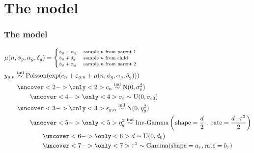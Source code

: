 \documentclass[handout]{beamer}
\providecommand{\e}{\varepsilon}
\numberwithin{equation}{section}
\begin{document}
\section{The model}
\setcounter{subsection}{1}

\begin{frame}
\frametitle{The model}

\begin{align*}
& \scriptsize \mu(n, \phi_g, \alpha_g, \delta_g) = \begin{cases}
\phi_g - \alpha_g & \text{ sample $n$ from parent 1} \\
\phi_g + \delta_g & \text{ sample $n$ from child} \\
\phi_g + \alpha_g & \text{ sample $n$ from parent 2} \\
\end{cases} \\ 
&y_{g,n} \stackrel{\text{ind}}{\sim} \text{Poisson}(\exp(c_n + \e_{g, n} + \mu(n, \phi_g, \alpha_g, \delta_g))) \\
&\qquad \uncover<2->{\only<2>{\color{blue}}c_n \stackrel{\text{ind}}{\sim} \text{N}(0, \sigma_c^2)} \\
& \qquad \qquad \uncover<4->{\only<4>{\color{blue}}\sigma_c \stackrel{\text{}}{\sim} \text{U}(0, \sigma_{c0})} \\
& \qquad \uncover<3->{\only<3>{\color{blue}}\e_{g, n} \stackrel{\text{ind}}{\sim} \text{N}(0, \eta_g^2)} \\
& \qquad \qquad \uncover<5->{\only<5>{\color{blue}}\eta_g^2 \stackrel{\text{ind}}{\sim} \text{Inv-Gamma}\left (\left . \text{shape} = \frac{d}{2} \right ., \ \text{rate} =  \frac{d \cdot \tau^2}{2} \right)} \\
& \qquad \qquad \qquad \uncover<6->{\only<6>{\color{blue}} d \stackrel{\text{}}{\sim} \text{U}(0, d_0)} \\
& \qquad \qquad \qquad \uncover<7->{\only<7>{\color{blue}} \tau^2 \stackrel{\text{}}{\sim} \text{Gamma}(\text{shape} = a_\tau, \text{rate} = b_\tau)} \\
\end{align*}
\end{frame}
\end{document}
